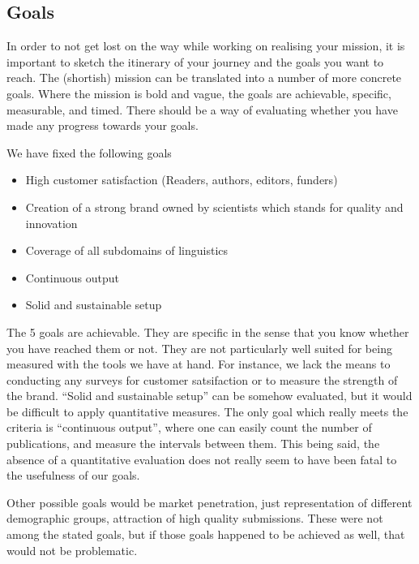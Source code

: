 \documentclass[nonflat,smallfont
]{langsci/langscibook}
\newcommand{\background}[1]{ 
  \vspace{5mm}
  \renewcommand{\tblslinecolour}{lsDarkBlue}
  \tblssy[red]{explore2}{Background}{\vspace*{-5mm}#1}
}
\newcommand{\langscisolution}[1]{
  \renewcommand{\tblslinecolour}{lsLightBlue}
  \tblssy{langsci}{LangSci solution}{\vspace*{-5mm}#1}
}
\newcommand{\evaluation}[1]{
  \renewcommand{\tblslinecolour}{lsLightOrange}
  \tblssy{receipt}{Evaluation}{\vspace*{-5mm}#1}
}
\newcommand{\othersolutions}[1]{
  \renewcommand{\tblslinecolour}{lsDarkGreenOne}
  \tblssy{more}{Other solutions}{\vspace*{-5mm}#1}
}
\renewcommand{\tblssy}[4][black!12]{%
  \renewcommand{\langscisymbol}{#2}\renewcommand{\tblsboxcolor}{#1}
  \begin{mdframed}[style=yellowexercise,frametitle={#3}]
    #4
  \end{mdframed}
}
\begin{document}
\subsection{Goals}
\vspace*{5mm}\background{In order to not get lost on the way while working on realising your mission, it is important to sketch the itinerary of your journey and the goals you want to reach. The (shortish) mission can be translated into a number of more concrete goals. Where the mission is bold and vague, the goals are achievable, specific, measurable, and timed. There should be a way of evaluating whether you have made any progress towards your goals.}
\langscisolution{
We have fixed the following goals
\begin{itemize}
\item High customer satisfaction (Readers, authors, editors, funders)
\item Creation of a strong brand owned by scientists which stands for quality and innovation
\item Coverage of all subdomains of linguistics
\item Continuous output
\item Solid and sustainable setup
\end{itemize} 
}
\evaluation{
The 5 goals are achievable. They are specific in the sense that you know whether you have reached them or not. They are not particularly well suited for being measured with the tools we have at hand. For instance,  we lack the means to conducting any surveys for customer satsifaction or to measure the strength of the brand. ``Solid and sustainable setup'' can be somehow evaluated, but it would be difficult to apply quantitative measures. The only goal which really meets the criteria is ``continuous output'', where one can easily count the number of publications, and measure the intervals between them. This being said, the absence of a quantitative evaluation does not really seem to have been fatal to the usefulness of our goals. 
}
\othersolutions{
Other possible goals would be market penetration, just representation of different demographic groups, attraction of high quality submissions. These were not among the stated goals, but if those goals happened to be achieved as well, that would not  be problematic.
} 
\end{document}
